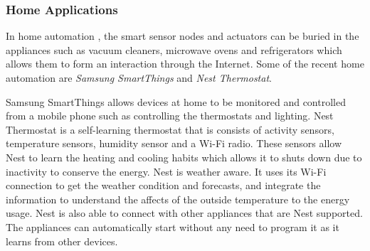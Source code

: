 \subsubsection{Home Applications}
In home automation \cite{homeautomation}, the smart sensor nodes and actuators can be buried in the appliances such as vacuum cleaners, microwave ovens and refrigerators which allows them to form an interaction through the Internet. Some of the recent home automation are \textit{Samsung SmartThings} and \textit{Nest Thermostat}.

Samsung SmartThings allows devices at home to be monitored and controlled from a mobile phone such as controlling the thermostats and lighting. Nest Thermostat is a self-learning thermostat that is consists of activity sensors, temperature sensors, humidity sensor and a Wi-Fi radio. These sensors allow Nest to learn the heating and cooling habits which allows it to shuts down due to inactivity to conserve the energy. Nest is weather aware. It uses its Wi-Fi connection to get the weather condition and forecasts, and integrate the information to understand the affects of the outside temperature to the energy usage. Nest is also able to connect with other appliances that are Nest supported. The appliances can automatically start without any need to program it as it learns from other devices.




